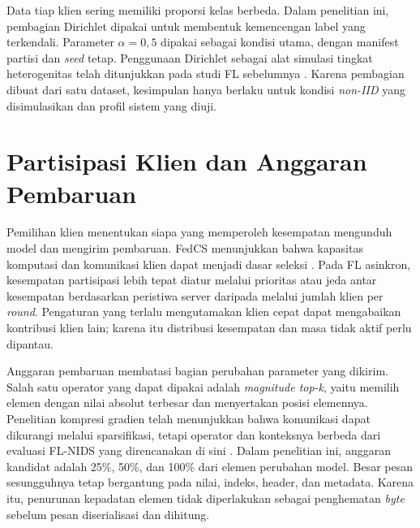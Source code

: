 Data tiap klien sering memiliki proporsi kelas berbeda. Dalam penelitian ini, pembagian Dirichlet dipakai untuk membentuk kemencengan label yang terkendali. Parameter $\alpha=0{,}5$ dipakai sebagai kondisi utama, dengan manifest partisi dan \textit{seed} tetap. Penggunaan Dirichlet sebagai alat simulasi tingkat heterogenitas telah ditunjukkan pada studi FL sebelumnya \cite{hsu2019}. Karena pembagian dibuat dari satu dataset, kesimpulan hanya berlaku untuk kondisi \textit{non-IID} yang disimulasikan dan profil sistem yang diuji.

\section{Partisipasi Klien dan Anggaran Pembaruan}
Pemilihan klien menentukan siapa yang memperoleh kesempatan mengunduh model dan mengirim pembaruan. FedCS menunjukkan bahwa kapasitas komputasi dan komunikasi klien dapat menjadi dasar seleksi \cite{nishio2019}. Pada FL asinkron, kesempatan partisipasi lebih tepat diatur melalui prioritas atau jeda antar kesempatan berdasarkan peristiwa server daripada melalui jumlah klien per \textit{round}. Pengaturan yang terlalu mengutamakan klien cepat dapat mengabaikan kontribusi klien lain; karena itu distribusi kesempatan dan masa tidak aktif perlu dipantau.

Anggaran pembaruan membatasi bagian perubahan parameter yang dikirim. Salah satu operator yang dapat dipakai adalah \textit{magnitude top-k}, yaitu memilih elemen dengan nilai absolut terbesar dan menyertakan posisi elemennya. Penelitian kompresi gradien telah menunjukkan bahwa komunikasi dapat dikurangi melalui sparsifikasi, tetapi operator dan konteksnya berbeda dari evaluasi FL-NIDS yang direncanakan di sini \cite{lin2018}. Dalam penelitian ini, anggaran kandidat adalah 25\%, 50\%, dan 100\% dari elemen perubahan model. Besar pesan sesungguhnya tetap bergantung pada nilai, indeks, header, dan metadata. Karena itu, penurunan kepadatan elemen tidak diperlakukan sebagai penghematan \textit{byte} sebelum pesan diserialisasi dan dihitung.

